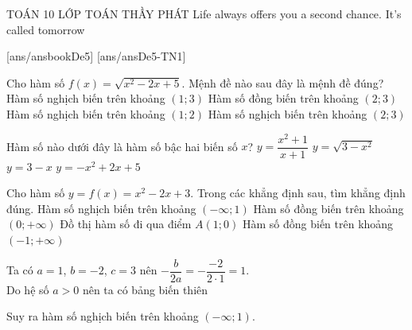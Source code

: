 \begin{name}
	{\tenchude}
	{TOÁN 10}
	{LỚP TOÁN THẦY PHÁT}
	{Life always offers you a second chance. It’s called tomorrow}
\end{name}
[ans/ansbookDe5]
\TN
{}[ans/ansDe5-TN1]
\begin{ex}%
Cho hàm số $ f(x) = \sqrt{x^2 - 2x + 5} $. Mệnh đề nào sau đây là mệnh đề đúng?
\choice
{Hàm số nghịch biến trên khoảng $(1;3)$}
{\True Hàm số đồng biến trên khoảng $(2;3)$}
{Hàm số nghịch biến trên khoảng $(1;2)$}
{Hàm số nghịch biến trên khoảng $(2;3)$}
\end{ex}

\begin{ex}%
Hàm số nào dưới đây là hàm số bậc hai biến số $x$?
\choice
{$y=\dfrac{x^2+1}{x+1}$}
{$y=\sqrt{3-x^2}$}
{$y=3-x$}
{\True $y=-x^2+2x+5$}
\end{ex}

\begin{ex}%
Cho hàm số $y=f(x)=x^2-2x+3$. Trong các khẳng định sau, tìm khẳng định đúng.
\choice
{\True Hàm số nghịch biến trên khoảng $(-\infty;1)$}
{Hàm số đồng biến trên khoảng $(0;+\infty)$}
{Đồ thị hàm số đi qua điểm $A(1;0)$}
{Hàm số đồng biến trên khoảng $(-1;+\infty)$}
\loigiai
{
Ta có $a=1$, $b=-2$, $c=3$ nên $-\dfrac{b}{2a}=-\dfrac{-2}{2 \cdot 1}=1$.\\
Do hệ số $a>0$ nên ta có bảng biến thiên
\begin{center}
\end{center}
Suy ra hàm số nghịch biến trên khoảng $(-\infty;1)$.
}
\end{ex}

